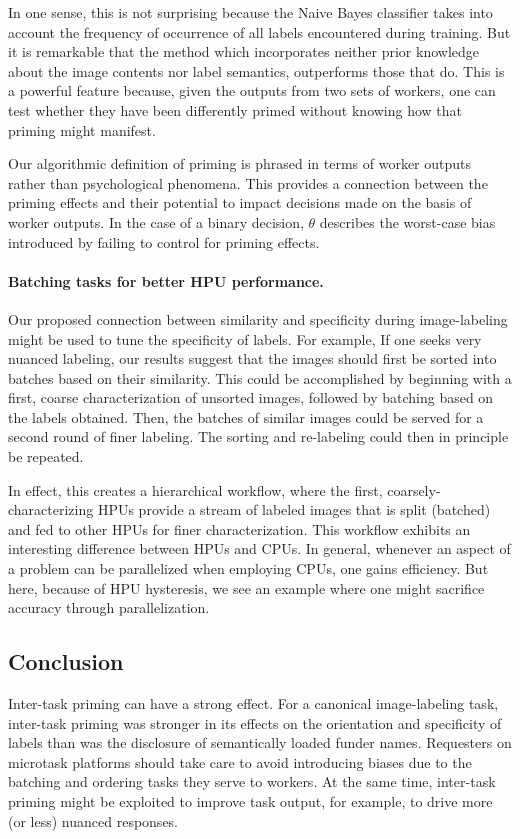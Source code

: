 \documentclass[letterpaper]{article}
\begin{document}
In one sense, this is not surprising because the Naive 
Bayes classifier takes into account the frequency of occurrence of all labels 
encountered during training.  But it is remarkable that the 
method which incorporates neither prior knowledge about the image contents nor 
label semantics, outperforms those that do.  This is a powerful feature 
because, given the outputs from two sets of workers, one can test whether they 
have been differently primed without knowing how that priming might manifest.

Our algorithmic definition of priming is phrased in terms of worker outputs
rather than psychological phenomena.  This provides a connection between
the priming effects and their potential to impact decisions made on the basis
of worker outputs.  In the case of a binary decision, $\theta$
describes the worst-case bias introduced by failing to control for priming 
effects.
\paragraph{Batching tasks for better HPU performance.}
Our proposed connection between similarity and specificity during 
image-labeling might be used to tune the specificity of labels.  For example,
If one seeks very nuanced labeling, our results suggest that the images 
should first be sorted into batches based on their similarity. This could be 
accomplished by beginning with a first, coarse characterization of unsorted 
images, followed by batching based on the labels obtained. Then, the batches
of similar images could be served for a second round of finer labeling. 
The sorting and re-labeling could then in principle be repeated.

In effect, this creates a hierarchical workflow, where the first, 
coarsely-characterizing HPUs provide a stream of labeled images that is 
split (batched) and fed to other HPUs for finer characterization.  This 
workflow exhibits an interesting difference between HPUs and CPUs.  In general,
whenever an aspect of a problem can be parallelized when employing CPUs, one
gains efficiency.  But here, because of HPU hysteresis, we see an example where
one might sacrifice accuracy through parallelization.
\subsection*{Conclusion}
Inter-task priming can have a strong effect.  
For a canonical image-labeling task, inter-task priming was stronger in its 
effects on the orientation and specificity of labels than was the disclosure of
semantically loaded funder names.  Requesters on microtask platforms should 
take care to avoid introducing biases due to the batching and ordering tasks 
they serve to workers.  At the same time, inter-task priming might be exploited to improve task output, for 
example, to drive more (or less) nuanced responses.
\end{document}
